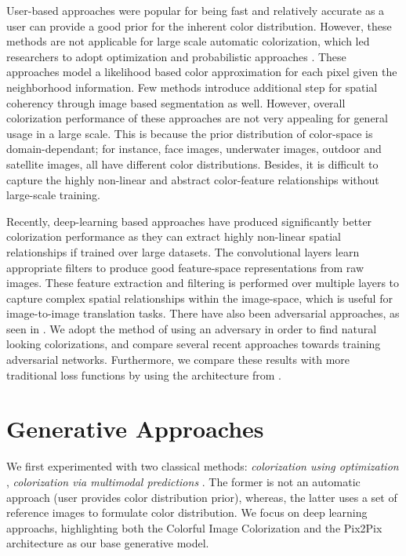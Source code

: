 \documentclass[10pt]{article}
\begin{document}
User-based approaches \cite{levin2004colorization, konushin2006interactive, reinhard2001color, vrhel1992color} were popular for being fast and relatively accurate as a user can provide a good
prior for the inherent color distribution. However, these methods are not applicable for large scale automatic colorization, which led researchers to adopt optimization and probabilistic
approaches \cite{charpiat2008automatic, bugeau2014variational, lagodzinski2008digital}. These approaches model a likelihood based color approximation for each pixel given the neighborhood information. 
Few methods introduce additional step for spatial coherency through image based segmentation as well. However, overall colorization performance of these approaches are not very appealing
\cite{deshpande2015learning} for general usage in a large scale. This is because the prior distribution of color-space is domain-dependant; for instance, face images, underwater images,
outdoor and satellite images, all have different color distributions. Besides, it is difficult to capture the highly non-linear and abstract color-feature relationships without large-scale training. 

Recently, deep-learning based approaches \cite{zhang2016colorful, cheng2015deep, varga2016fully, li2017watergan} have produced significantly better colorization performance as they can extract
highly non-linear spatial relationships if trained over large datasets. The convolutional layers learn appropriate filters to produce good feature-space representations from raw images.
These feature extraction and filtering is performed over multiple layers to capture complex spatial relationships within the image-space, which is useful for image-to-image translation tasks.
There have also been adversarial approaches, as seen in \cite{isola2016image}. We adopt the method of using an adversary in order to find natural looking colorizations, and compare several
recent approaches towards training adversarial networks. Furthermore, we compare these results with more traditional loss functions by using the architecture from \cite{zhang2016colorful}.

\section{Generative Approaches}
We first experimented with two classical methods: \textit{colorization using optimization} \cite{levin2004colorization}, \textit{colorization via multimodal predictions} \cite{charpiat2008automatic}.
The former is not an automatic approach (user provides color distribution prior), whereas, the latter uses a set of reference images to formulate color distribution.
We focus on deep learning approachs, highlighting both the Colorful Image Colorization \cite{zhang2016colorful} and the Pix2Pix \cite{isola2016image} architecture as our base generative model.
\end{document}
